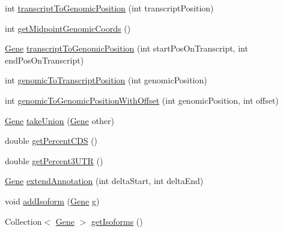 \begin{DoxyCompactItemize}
int \hyperlink{classumms_1_1core_1_1annotation_1_1_gene_ad12935fea9cdb57e8ef9ae283777f31f}{transcript\+To\+Genomic\+Position} (int transcript\+Position)
\item 
int \hyperlink{classumms_1_1core_1_1annotation_1_1_gene_ac26fe7612bd2bafe2c58ffb088a3ddef}{get\+Midpoint\+Genomic\+Coords} ()
\item 
\hyperlink{classumms_1_1core_1_1annotation_1_1_gene}{Gene} \hyperlink{classumms_1_1core_1_1annotation_1_1_gene_ab39e50ecf3b00dbf0a984b956d8a5d0d}{transcript\+To\+Genomic\+Position} (int start\+Pos\+On\+Transcript, int end\+Pos\+On\+Transcript)
\item 
int \hyperlink{classumms_1_1core_1_1annotation_1_1_gene_a30c16cb2d10856f49e7d79d15f2da795}{genomic\+To\+Transcript\+Position} (int genomic\+Position)
\item 
int \hyperlink{classumms_1_1core_1_1annotation_1_1_gene_a24c4baf757d1fec374f8d7cfad9f1578}{genomic\+To\+Genomic\+Position\+With\+Offset} (int genomic\+Position, int offset)
\item 
\hyperlink{classumms_1_1core_1_1annotation_1_1_gene}{Gene} \hyperlink{classumms_1_1core_1_1annotation_1_1_gene_a3730df1a8a2d66a231024eb64e9cd25c}{take\+Union} (\hyperlink{classumms_1_1core_1_1annotation_1_1_gene}{Gene} other)
\item 
double \hyperlink{classumms_1_1core_1_1annotation_1_1_gene_ac62559d5d9adc8f6b3f8ac9da7d41a54}{get\+Percent\+C\+D\+S} ()
\item 
double \hyperlink{classumms_1_1core_1_1annotation_1_1_gene_aadc804eb8e2ac39c271509a51b1091ef}{get\+Percent3\+U\+T\+R} ()
\item 
\hyperlink{classumms_1_1core_1_1annotation_1_1_gene}{Gene} \hyperlink{classumms_1_1core_1_1annotation_1_1_gene_a4a2d55b6a2d9b9837595300202063b70}{extend\+Annotation} (int delta\+Start, int delta\+End)
\item 
void \hyperlink{classumms_1_1core_1_1annotation_1_1_gene_ae88af19e1cb922df8a7a4dd66b5b0609}{add\+Isoform} (\hyperlink{classumms_1_1core_1_1annotation_1_1_gene}{Gene} g)
\item 
Collection$<$ \hyperlink{classumms_1_1core_1_1annotation_1_1_gene}{Gene} $>$ \hyperlink{classumms_1_1core_1_1annotation_1_1_gene_abedac8afb5f8441e6f0d1e54de1239e5}{get\+Isoforms} ()
\end{DoxyCompactItemize}
